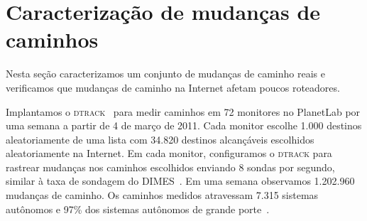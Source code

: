 \documentclass{JBCS}
\newcommand{\dtrack}{\textsc{dtrack}}
\begin{document}
\vspace{-5mm}
\section{Caracterização de mudanças de caminhos}
\label{sec:char}

Nesta seção caracterizamos um conjunto de mudanças de caminho reais e
verificamos que mudanças de caminho na Internet afetam poucos
roteadores.

Implantamos o \dtrack{}~\cite{cunha11dtrack} para medir caminhos em 72
monitores no PlanetLab por uma semana a partir de 4 de março de 2011.
Cada monitor escolhe 1.000 destinos aleatoriamente de uma lista com
34.820 destinos alcançáveis escolhidos aleatoriamente na Internet.  Em
cada monitor, configuramos o \dtrack{} para rastrear mudanças nos
caminhos escolhidos enviando 8 sondas por segundo, similar à taxa de
sondagem do DIMES~\cite{shavitt09dimes}.  Em uma semana observamos
1.202.960 mudanças de caminho.  Os caminhos medidos atravessam 7.315
sistemas autônomos e 97\% dos sistemas autônomos de grande
porte~\cite{oliveira08as2tier}.
\end{document}

